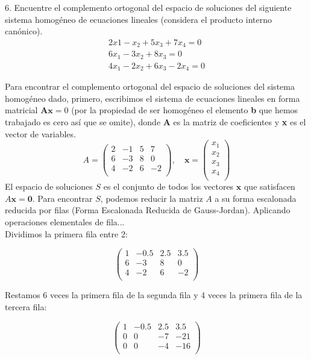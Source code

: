 6. Encuentre el complemento ortogonal del espacio de soluciones del siguiente sistema homogéneo de ecuaciones lineales (considera el producto interno canónico).
\[\begin{array}{l}2x1-x_2+5x_3+7x_4=0\\ 6x_1-3x_2+8x_3=0\\ 4x_1-2x_2+6x_3-2x_4=0\end{array}\]

\begin{solution}
Para encontrar el complemento ortogonal del espacio de soluciones del sistema homogéneo dado, primero, escribimos el sistema de ecuaciones lineales en forma matricial $\textbf{Ax}=0$ (por la propiedad de ser homogéneo el elemento \textbf{b} que hemos trabajado es cero así que se omite), donde \textbf{A} es la matriz de coeficientes y \textbf{x} es el vector de variables.
\[
A = 
\begin{pmatrix}
2 & -1 & 5 & 7 \\
6 & -3 & 8 & 0 \\
4 & -2 & 6 & -2 \\
\end{pmatrix}, \quad
\mathbf{x} = 
\begin{pmatrix}
x_1 \\
x_2 \\
x_3 \\
x_4 \\
\end{pmatrix}
\]
El espacio de soluciones \( S \) es el conjunto de todos los vectores \( \mathbf{x} \) que satisfacen \( A\mathbf{x} = \mathbf{0} \). Para encontrar \( S \), podemos reducir la matriz \( A \) a su forma escalonada reducida por filas (Forma Escalonada Reducida de Gauss-Jordan). Aplicando operaciones elementales de fila... \\

Dividimos la primera fila entre 2:

\[
\begin{pmatrix}
1 & -0.5 & 2.5 & 3.5 \\
6 & -3 & 8 & 0 \\
4 & -2 & 6 & -2 \\
\end{pmatrix}
\]

Restamos 6 veces la primera fila de la segunda fila y 4 veces la primera fila de la tercera fila:

\[
\begin{pmatrix}
1 & -0.5 & 2.5 & 3.5 \\
0 & 0 & -7 & -21 \\
0 & 0 & -4 & -16 \\
\end{pmatrix}
\]


\end{solution}
